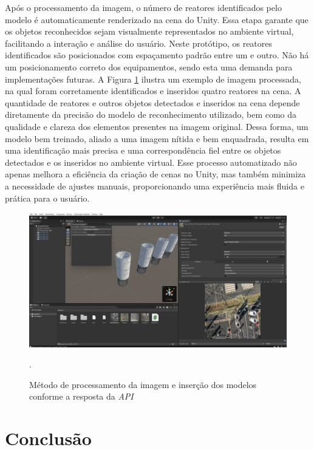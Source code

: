 Após o processamento da imagem, o número de reatores identificados pelo modelo é automaticamente renderizado na cena do Unity. Essa etapa garante que os objetos reconhecidos sejam visualmente representados no ambiente virtual, facilitando a interação e análise do usuário. Neste protótipo, os reatores identificados são posicionados com espaçamento padrão entre um e outro. Não há um posicionamento correto dos equipamentos, sendo esta uma demanda para implementações futuras. A Figura \ref{fig:predict} ilustra um exemplo de imagem processada, na qual foram corretamente identificados e inseridos quatro reatores na cena. A quantidade de reatores e outros objetos detectados e inseridos na cena depende diretamente da precisão do modelo de reconhecimento utilizado, bem como da qualidade e clareza dos elementos presentes na imagem original. Dessa forma, um modelo bem treinado, aliado a uma imagem nítida e bem enquadrada, resulta em uma identificação mais precisa e uma correspondência fiel entre os objetos detectados e os inseridos no ambiente virtual. Esse processo automatizado não apenas melhora a eficiência da criação de cenas no Unity, mas também minimiza a necessidade de ajustes manuais, proporcionando uma experiência mais fluida e prática para o usuário.

\begin{figure}[!h]
    \centering
    \begin{minipage}{0.9\linewidth}
    \centering
    \captionsetup{justification=centering,margin=0.5cm,font=small}
    \includegraphics[width=1\linewidth]{img/cap5/predict.jpeg}
    \caption{Método de processamento da imagem e inserção dos modelos conforme a resposta da \textit{API}}.
    \label{fig:predict}
    \end{minipage}
\end{figure}

\section{Conclusão}

